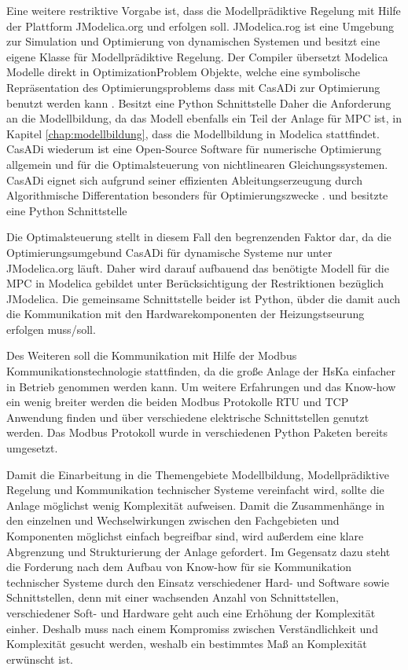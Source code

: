 Eine weitere restriktive Vorgabe ist, dass die Modellprädiktive Regelung mit Hilfe der Plattform JModelica.org und erfolgen soll. JModelica.rog ist eine Umgebung zur Simulation und Optimierung von dynamischen Systemen \cite[S.~1f.]{jmod15} und besitzt eine eigene Klasse für Modellprädiktive Regelung. Der Compiler übersetzt Modelica Modelle direkt in OptimizationProblem Objekte, welche eine symbolische Repräsentation des Optimierungsproblems dass mit CasADi \cite{An13} zur Optimierung benutzt werden kann \cite[S.~12]{jmod15}. Besitzt eine Python Schnittstelle
Daher die Anforderung an die Modellbildung, da das Modell ebenfalls ein Teil der Anlage für MPC ist, in Kapitel \ref{chap:modellbildung}, dass die Modellbildung in Modelica stattfindet.
CasADi wiederum ist eine Open-Source Software für numerische Optimierung allgemein und für die Optimalsteuerung von nichtlinearen Gleichungssystemen. CasADi eignet sich aufgrund seiner effizienten Ableitungserzeugung durch Algorithmische Differentation besonders für Optimierungszwecke \cite[S.~5f.]{casadi}. und besitzte eine Python Schnittstelle

Die Optimalsteuerung stellt in diesem Fall den begrenzenden Faktor dar, da die Optimierungsumgebund CasADi für dynamische Systeme nur unter JModelica.org läuft. Daher wird darauf aufbauend das benötigte Modell für die MPC in Modelica gebildet unter Berücksichtigung der Restriktionen bezüglich JModelica. Die gemeinsame Schnittstelle beider ist Python, übder die damit auch die Kommunikation mit den Hardwarekomponenten der Heizungstseurung erfolgen muss/soll.

Des Weiteren soll die Kommunikation mit Hilfe der Modbus Kommunikationstechnologie stattfinden, da die große Anlage der HsKa einfacher in Betrieb genommen werden kann. Um weitere Erfahrungen und das Know-how ein wenig breiter werden die beiden Modbus Protokolle RTU und TCP Anwendung finden und über verschiedene elektrische Schnittstellen genutzt werden. Das Modbus Protokoll wurde in verschiedenen Python Paketen bereits umgesetzt.

Damit die Einarbeitung in die Themengebiete Modellbildung, Modellprädiktive Regelung und Kommunikation technischer Systeme vereinfacht wird, sollte die Anlage möglichst wenig Komplexität aufweisen. Damit die Zusammenhänge in den einzelnen und Wechselwirkungen zwischen den Fachgebieten und Komponenten möglichst einfach begreifbar sind, wird außerdem eine klare Abgrenzung und Strukturierung der Anlage gefordert. Im Gegensatz dazu steht die Forderung nach dem Aufbau von Know-how für sie Kommunikation technischer Systeme durch den Einsatz verschiedener Hard- und Software sowie Schnittstellen, denn mit einer wachsenden Anzahl von Schnittstellen, verschiedener Soft- und Hardware geht auch eine Erhöhung der Komplexität einher.
Deshalb muss nach einem Kompromiss zwischen Verständlichkeit und Komplexität gesucht werden, weshalb ein bestimmtes Maß an Komplexität erwünscht ist.

